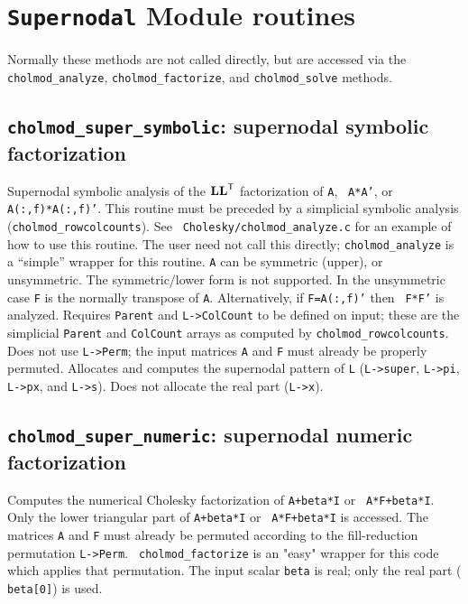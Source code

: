 \documentclass[11pt]{article}
\newcommand{\m}[1]{{\bf{#1}}}       %
\newcommand{\tr}{^{\sf T}}          %
\begin{document}
\newpage \section{{\tt Supernodal} Module routines}

Normally these methods are not called directly, but are accessed via the
\verb'cholmod_analyze', \verb'cholmod_factorize', and \verb'cholmod_solve'
methods.

\subsection{{\tt cholmod\_super\_symbolic}: supernodal symbolic factorization}


Supernodal symbolic analysis of the $\m{LL}\tr$ factorization of {\tt A}, {\tt
A*A'}, or {\tt A(:,f)*A(:,f)'}.  This routine must be preceded by a simplicial
symbolic analysis ({\tt cholmod\_rowcolcounts}).  See {\tt
Cholesky/cholmod\_analyze.c} for an example of how to use this routine.  The
user need not call this directly; {\tt cholmod\_analyze} is a ``simple''
wrapper for this routine.  {\tt A} can be symmetric (upper), or unsymmetric.
The symmetric/lower form is not supported.  In the unsymmetric case {\tt F} is
the normally transpose of {\tt A}.  Alternatively, if {\tt F=A(:,f)'} then {\tt
F*F'} is analyzed.  Requires {\tt Parent} and {\tt L->ColCount} to be defined
on input; these are the simplicial {\tt Parent} and {\tt ColCount} arrays as
computed by {\tt cholmod\_rowcolcounts}.  Does not use {\tt L->Perm}; the input
matrices {\tt A} and {\tt F} must already be properly permuted.  Allocates and
computes the supernodal pattern of {\tt L} ({\tt L->super}, {\tt L->pi}, {\tt
L->px}, and {\tt L->s}).  Does not allocate the real part ({\tt L->x}).

\subsection{{\tt cholmod\_super\_numeric}: supernodal numeric factorization}


Computes the numerical Cholesky factorization of {\tt A+beta*I} or {\tt
A*F+beta*I}.  Only the lower triangular part of {\tt A+beta*I} or {\tt
A*F+beta*I} is accessed.  The matrices {\tt A} and {\tt F} must already be
permuted according to the fill-reduction permutation {\tt L->Perm}.  {\tt
cholmod\_factorize} is an "easy" wrapper for this code which applies that
permutation.  The input scalar {\tt beta} is real; only the real part ({\tt
beta[0]}) is used.
\end{document}
